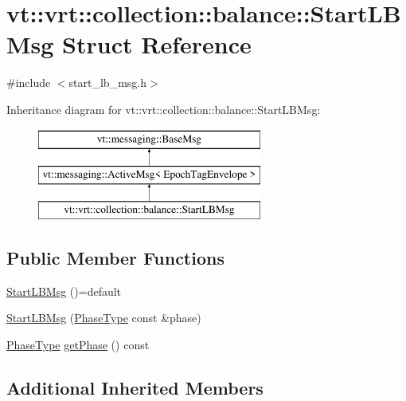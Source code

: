 \hypertarget{structvt_1_1vrt_1_1collection_1_1balance_1_1_start_l_b_msg}{}\section{vt\+:\+:vrt\+:\+:collection\+:\+:balance\+:\+:Start\+L\+B\+Msg Struct Reference}
\label{structvt_1_1vrt_1_1collection_1_1balance_1_1_start_l_b_msg}


{\ttfamily \#include $<$start\+\_\+lb\+\_\+msg.\+h$>$}

Inheritance diagram for vt\+:\+:vrt\+:\+:collection\+:\+:balance\+:\+:Start\+L\+B\+Msg\+:\begin{figure}[H]
\begin{center}
\leavevmode
\includegraphics[height=3.000000cm]{structvt_1_1vrt_1_1collection_1_1balance_1_1_start_l_b_msg}
\end{center}
\end{figure}
\subsection*{Public Member Functions}
\begin{DoxyCompactItemize}
\item 
\hyperlink{structvt_1_1vrt_1_1collection_1_1balance_1_1_start_l_b_msg_af719b75f9ab5ffa464973a030781fb5e}{Start\+L\+B\+Msg} ()=default
\item 
\hyperlink{structvt_1_1vrt_1_1collection_1_1balance_1_1_start_l_b_msg_a0fe9606ee21d5f26bdbebb0510a29dd5}{Start\+L\+B\+Msg} (\hyperlink{namespacevt_a46ce6733d5cdbd735d561b7b4029f6d7}{Phase\+Type} const \&phase)
\item 
\hyperlink{namespacevt_a46ce6733d5cdbd735d561b7b4029f6d7}{Phase\+Type} \hyperlink{structvt_1_1vrt_1_1collection_1_1balance_1_1_start_l_b_msg_ac932d065333978204f0afbc441a23b87}{get\+Phase} () const
\end{DoxyCompactItemize}
\subsection*{Additional Inherited Members}



